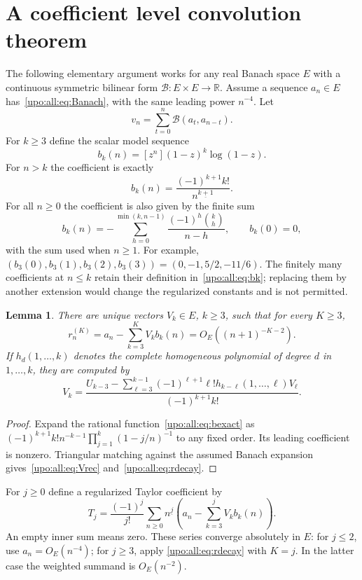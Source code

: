 \documentclass[11pt,letterpaper]{article}
\newtheorem{lemma}[theorem]{Lemma}
\theoremstyle{remark}\newtheorem{remark}[theorem]{Remark}
\numberwithin{equation}{section}
\newcommand{\B}{\mathcal B}
\newcommand{\fall}[2]{#1^{\underline{#2}}}
\begin{document}
\section{A coefficient level convolution theorem}\label{upo:all:sec:conv}
The following elementary argument works for any real Banach space $E$
with a continuous symmetric bilinear form $\B:E\times E\to\mathbb R$.
Assume a sequence $a_n\in E$ has~\eqref{upo:all:eq:Banach}, with the same leading
power $n^{-4}$. Let
\[
v_n=\sum_{t=0}^n\B(a_t,a_{n-t}).
\]
For $k\ge3$ define the scalar model sequence
\begin{equation}\label{upo:all:eq:bk}
b_k(n)=[z^n](1-z)^k\log(1-z).
\end{equation}
For $n>k$ the coefficient is exactly
\begin{equation}\label{upo:all:eq:bexact}
b_k(n)=\frac{(-1)^{k+1}k!}{\fall n{k+1}}.
\end{equation}
For all $n\ge0$ the coefficient is also given by the finite sum
\[
b_k(n)=-\sum_{h=0}^{\min(k,n-1)}\frac{(-1)^h\binom kh}{n-h},
\qquad b_k(0)=0,
\]
with the sum used when $n\ge1$. For example,
$(b_3(0),b_3(1),b_3(2),b_3(3))=(0,-1,5/2,-11/6)$.
The finitely many coefficients at $n\le k$ retain their definition
in~\eqref{upo:all:eq:bk}; replacing them by another extension would change the
regularized constants and is not permitted.

\begin{lemma}\label{upo:all:lem:models}
There are unique vectors $V_k\in E$, $k\ge3$, such that for every
$K\ge3$,
\begin{equation}\label{upo:all:eq:rdecay}
r^{(K)}_n=a_n-\sum_{k=3}^KV_kb_k(n)=O_E((n+1)^{-K-2}).
\end{equation}
If $h_d(1,\ldots,k)$ denotes the complete homogeneous polynomial of
degree $d$ in $1,\ldots,k$, they are computed by
\begin{equation}\label{upo:all:eq:Vrec}
V_k=\frac{U_{k-3}-\sum_{\ell=3}^{k-1}
 (-1)^{\ell+1}\ell!h_{k-\ell}(1,\ldots,\ell)V_\ell}
 {(-1)^{k+1}k!}.
\end{equation}
\end{lemma}
\begin{proof}
Expand the rational function~\eqref{upo:all:eq:bexact} as
$(-1)^{k+1}k!n^{-k-1}\prod_{j=1}^k(1-j/n)^{-1}$ to any fixed order.
Its leading coefficient is nonzero. Triangular matching against the
assumed Banach expansion gives~\eqref{upo:all:eq:Vrec} and~\eqref{upo:all:eq:rdecay}.
\end{proof}

For $j\ge0$ define a regularized Taylor coefficient by
\begin{equation}\label{upo:all:eq:Tj}
T_j=\frac{(-1)^j}{j!}\sum_{n\ge0}\fall nj
 \left(a_n-\sum_{k=3}^{j}V_kb_k(n)\right).
\end{equation}
An empty inner sum means zero. These series converge absolutely in $E$:
for $j\le2$, use $a_n=O_E(n^{-4})$; for $j\ge3$, apply
\eqref{upo:all:eq:rdecay} with $K=j$. In the latter case the weighted summand is
$O_E(n^{-2})$.
\end{document}

